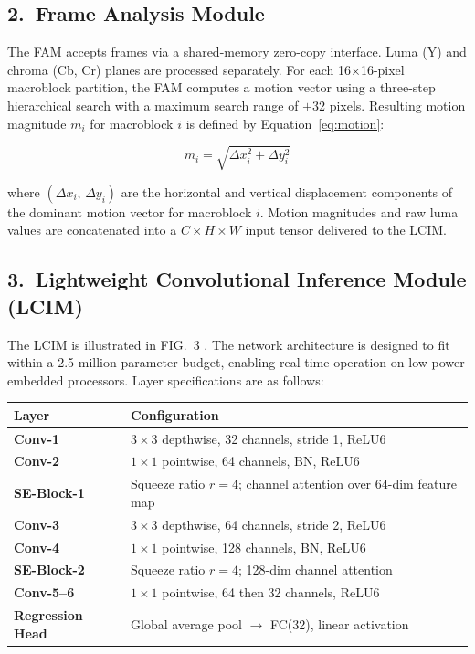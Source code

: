 \subsection{2.~Frame Analysis Module}

The FAM accepts frames via a shared-memory zero-copy interface. Luma (Y) and chroma
(Cb, Cr) planes are processed separately. For each 16$\times$16-pixel macroblock
partition, the FAM computes a motion vector using a three-step hierarchical search with
a maximum search range of $\pm$32 pixels. Resulting motion magnitude $m_i$ for
macroblock $i$ is defined by Equation~\eqref{eq:motion}:

\begin{equation}\label{eq:motion}
  m_i = \sqrt{\Delta x_i^{2} + \Delta y_i^{2}}
\end{equation}

where $(\Delta x_i,\, \Delta y_i)$ are the horizontal and vertical displacement
components of the dominant motion vector for macroblock $i$. Motion magnitudes and
raw luma values are concatenated into a $C \times H \times W$ input tensor delivered
to the LCIM.

\subsection{3.~Lightweight Convolutional Inference Module (LCIM)}

The LCIM is illustrated in FIG.~3 . The network architecture is designed
to fit within a 2.5-million-parameter budget, enabling real-time operation on
low-power embedded processors. Layer specifications are as follows:

\vspace{4pt}
\begin{tabularx}{\linewidth}{@{}>{\bfseries\color{accent}}l@{\hspace{6mm}}>{\raggedright\arraybackslash}X@{}}
  \toprule
  \rowcolor{lightgray}
  \textbf{\color{black}Layer} & \textbf{\color{black}Configuration} \\
  \midrule
  Conv-1 & $3\!\times\!3$ depthwise, 32 channels, stride 1, ReLU6 \\[2pt]
  Conv-2 & $1\!\times\!1$ pointwise, 64 channels, BN, ReLU6 \\[2pt]
  SE-Block-1 & Squeeze ratio $r=4$; channel attention over 64-dim feature map \\[2pt]
  Conv-3 & $3\!\times\!3$ depthwise, 64 channels, stride 2, ReLU6 \\[2pt]
  Conv-4 & $1\!\times\!1$ pointwise, 128 channels, BN, ReLU6 \\[2pt]
  SE-Block-2 & Squeeze ratio $r=4$; 128-dim channel attention \\[2pt]
  Conv-5--6 & $1\!\times\!1$ pointwise, 64 then 32 channels, ReLU6 \\[2pt]
  Regression Head & Global average pool $\to$ FC(32), linear activation \\[2pt]
  \bottomrule
\end{tabularx}
\vspace{4pt}

